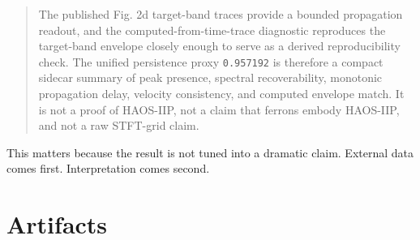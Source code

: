 \documentclass[11pt]{article}
\begin{document}
\begin{quote}
The published Fig. 2d target-band traces provide a bounded propagation readout,
and the computed-from-time-trace diagnostic reproduces the target-band envelope
closely enough to serve as a derived reproducibility check. The unified
persistence proxy \texttt{0.957192} is therefore a compact sidecar summary of
peak presence, spectral recoverability, monotonic propagation delay, velocity
consistency, and computed envelope match. It is not a proof of HAOS-IIP, not a
claim that ferrons embody HAOS-IIP, and not a raw STFT-grid claim.
\end{quote}

This matters because the result is not tuned into a dramatic claim. External data comes first. Interpretation comes second.

\section{Artifacts}
\end{document}
